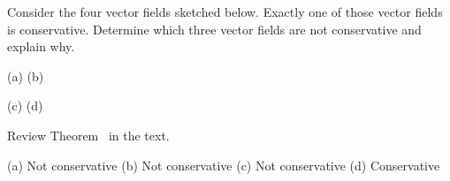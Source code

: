 \begin{question}
Consider the four vector fields sketched below. Exactly one of
those vector fields is conservative. Determine which three vector fields 
are not conservative and explain why.
\begin{center}
      (a) \qquad
      (b) \qquad
\end{center}
\begin{center}
      (c) \qquad
      (d) \qquad
\end{center}
\end{question}

\begin{hint} 
Review Theorem~ in the text.
\end{hint}

\begin{answer} 
(a) Not conservative \quad
(b) Not conservative \quad
(c) Not conservative \quad
(d) Conservative 
\end{answer}

